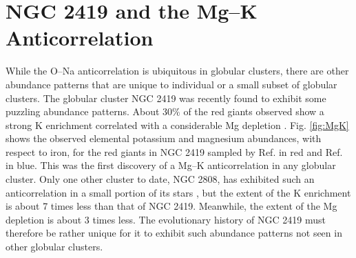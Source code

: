 
\section{NGC 2419 and the Mg--K Anticorrelation} \label{sec:NGC2419}



While the O--Na anticorrelation is ubiquitous in globular clusters, there are other abundance patterns that are unique to individual or a small subset of globular clusters. The globular cluster NGC 2419 was recently found to exhibit some puzzling abundance patterns. About 30$\%$ of the red giants observed show a strong K enrichment correlated with a considerable Mg depletion \cite{Mucciarelli2012,Cohen2012}. Fig. \ref{fig:MgK} shows the observed elemental potassium and magnesium abundances, with respect to iron, for the red giants in NGC 2419 sampled by Ref. \cite{Mucciarelli2012} in red and Ref. \cite{Cohen2012} in blue. This was the first discovery of a Mg--K anticorrelation in any globular cluster. Only one other cluster to date, NGC 2808, has exhibited such an anticorrelation in a small portion of its stars \cite{Mucciarelli2015,Mucciarelli2017}, but the extent of the K enrichment is about 7 times less than that of NGC 2419. Meanwhile, the extent of the Mg depletion is about 3 times less. The evolutionary history of NGC 2419 must therefore be rather unique for it to exhibit such abundance patterns not seen in other globular clusters.


